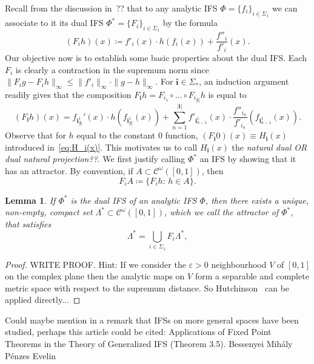 \documentclass[12pt,]{article}
\def\cref#1{\ref{#1}}%
\newtheorem{lemma}[theorem]{Lemma}
\theoremstyle{definition}
\theoremstyle{remark}
\newcommand{\0}{\mathbf{0}}
\newcommand{\bi}{\mathbf{i}}
\begin{document}
{Recall from the discussion in~?? that to any analytic IFS $\Phi=\{f_i\}_{i\in\Sigma_1}$ we can
associate to it its dual IFS $\Phi^*=\{F_i\}_{i\in\Sigma_1}$ by the formula
\begin{equation}\label{eq:LiftedIFS}
	(F_i h)(x)\coloneqq f'_i(x)\cdot h(f_i(x)) + \frac{f''_i}{f'_i}(x).
\end{equation}
Our objective now is to establish some basic properties about the dual IFS. Each $F_i$ is clearly a
contraction in the supremum norm since $\|F_ig-F_ih\|_{\infty}\leq \|f'_i\|_{\infty}\cdot
\|g-h\|_{\infty}$. For $\bi\in\Sigma_*$, an induction argument readily gives that the composition
$F_{\bi}h=F_{i_1}\circ\ldots\circ F_{i_{|\bi|}}h$ is equal to
\begin{equation}\label{eq:IteratesLiftedIFS}
	(F_{\bi}h)(x) = f_{\bi_{|\bi|}^1}'(x)\cdot h(f_{\bi_{|\bi|}^1}(x)) + \sum_{n=1}^{|\bi|}
	f'_{\bi_{n-1}^1}(x) \cdot 
	\frac{f''_{i_n}}{f'_{i_n}}(f_{\bi_{n-1}^1}(x)).
\end{equation}
Observe that for $h$ equal to the constant $0$ function, $(F_{\bi}0)(x)\equiv H_{\bi}(x)$ introduced
in~\cref{eq:H_i(x)}. This motivates us to call $H_{\bi}(x)$ the {\color{red} \emph{natural dual OR
dual natural projection??}.} We first justify calling $\Phi^*$ an IFS by showing that it has an
attractor. By convention, if $A\subset \mathcal{C}^{\omega}([0,1])$, then
\begin{equation*}
F_iA \coloneqq \{F_i h:\, h\in A\}.
\end{equation*}
\begin{lemma}\label{lem:ExistanceAttractor}
If $\Phi^*$ is the dual IFS of an analytic IFS $\Phi$, then there exists a unique, non-empty,
compact set $\Lambda^*\subset \mathcal{C}^{\omega}([0,1])$, which we call the \emph{attractor} of
$\Phi^*$, that satisfies
\begin{equation*}
\Lambda^*=\bigcup_{i\in\Sigma_1} F_i\Lambda^*,
\end{equation*} 
\end{lemma} 
\begin{proof}
{\color{red} WRITE PROOF. Hint: If we consider the $\varepsilon>0$ neighbourhood $V$ of $[0,1]$ on
the complex plane then the analytic maps on $V$ form a separable and complete metric space with
respect to the supremum distance. So Hutchinson~\cite{Hutchinson_Attractor_81} can be applied
directly...}
\end{proof}

{\color{red} Could maybe mention in a remark that IFSs on more general spaces have been studied,
perhaps this article could be cited: Applications of Fixed Point Theorems in the Theory of
Generalized IFS (Theorem 3.5). Bessenyei Mih\'aly  P\'enzes Evelin}

}
\end{document}
